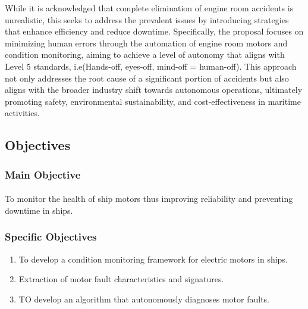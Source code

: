 While it is acknowledged that complete elimination of engine room accidents is unrealistic, this seeks to address the prevalent issues by introducing strategies that enhance efficiency and reduce downtime. Specifically, the proposal focuses on minimizing human errors through the automation of engine room motors and condition monitoring, aiming to achieve a level of autonomy that aligns with Level 5 standards, i.e(Hands-off, eyes-off, mind-off = human-off). This approach not only addresses the root cause of a significant portion of accidents but also aligns with the broader industry shift towards autonomous operations, ultimately promoting safety, environmental sustainability, and cost-effectiveness in maritime activities.\cite{noauthor_13_nodate}



\subsection{Objectives}
\subsubsection{Main Objective}
\paragraph{}  To monitor the health of ship motors thus improving reliability and preventing downtime
in ships. 
\subsubsection{Specific Objectives}
\begin{enumerate}
\item  To develop a condition monitoring framework for electric motors in ships.
\item Extraction of motor fault characteristics and signatures.
\item TO develop an algorithm that autonomously diagnoses motor faults.

\end{enumerate}
